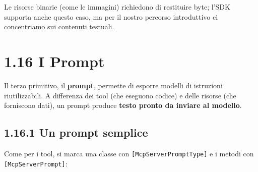 \documentclass[
  italian,
  10pt,
]{book}
\begin{document}
Le risorse binarie (come le immagini) richiedono di restituire byte;
l'SDK supporta anche questo caso, ma per il nostro percorso introduttivo
ci concentriamo sui contenuti testuali.

\section{1.16 I Prompt}\label{i-prompt}

Il terzo primitivo, il \textbf{prompt}, permette di esporre modelli di
istruzioni riutilizzabili. A differenza dei tool (che eseguono codice) e
delle risorse (che forniscono dati), un prompt produce \textbf{testo
pronto da inviare al modello}.

\subsection{1.16.1 Un prompt semplice}\label{un-prompt-semplice}

Come per i tool, si marca una classe con
\texttt{{[}McpServerPromptType{]}} e i metodi con
\texttt{{[}McpServerPrompt{]}}:
\end{document}
